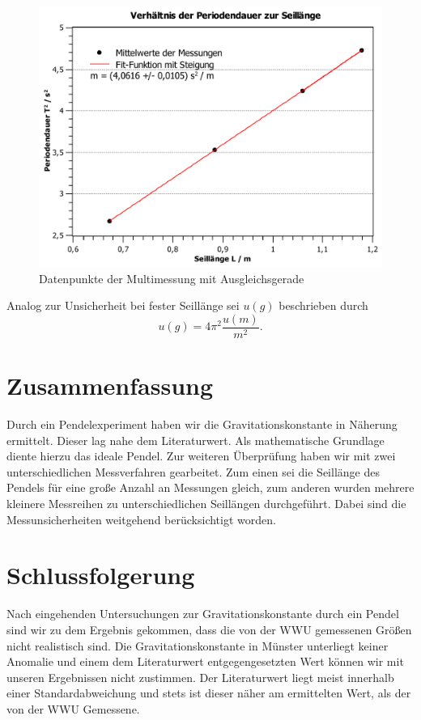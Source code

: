 \documentclass[11pt,a4paper,titlepage, ngerman]{article}
\begin{document}
		\begin{figure}
			\centering
			\includegraphics[width=\textwidth]{SteigungMultimessung.pdf}
			\caption{Datenpunkte der Multimessung mit Ausgleichsgerade}
			\label{fig:multi}
		\end{figure}
		
		Analog zur Unsicherheit bei fester Seillänge sei $u(g)$ beschrieben durch
		\begin{equation*}
			u(g) = 4\pi^2 \frac{u(m)}{m^2}.
		\end{equation*}
		
	\section{Zusammenfassung}
		Durch ein Pendelexperiment haben wir die Gravitationskonstante in Näherung ermittelt.
		Dieser lag nahe dem Literaturwert.
		Als mathematische Grundlage diente hierzu das ideale Pendel.
		Zur weiteren Überprüfung haben wir mit zwei unterschiedlichen Messverfahren gearbeitet.
		Zum einen sei die Seillänge des Pendels für eine große Anzahl an Messungen gleich, zum anderen wurden mehrere kleinere Messreihen zu unterschiedlichen Seillängen durchgeführt.
		Dabei sind die Messunsicherheiten weitgehend berücksichtigt worden.		
		
	\section{Schlussfolgerung}
		Nach eingehenden Untersuchungen zur Gravitationskonstante durch ein Pendel sind wir zu dem Ergebnis gekommen, dass die von der WWU gemessenen Größen nicht realistisch sind.
		Die Gravitationskonstante in Münster unterliegt keiner Anomalie und einem dem Literaturwert entgegengesetzten Wert können wir mit unseren Ergebnissen nicht zustimmen.
		Der Literaturwert liegt meist innerhalb einer Standardabweichung und stets ist dieser näher am ermittelten Wert, als der von der WWU Gemessene.
		
\end{document}
